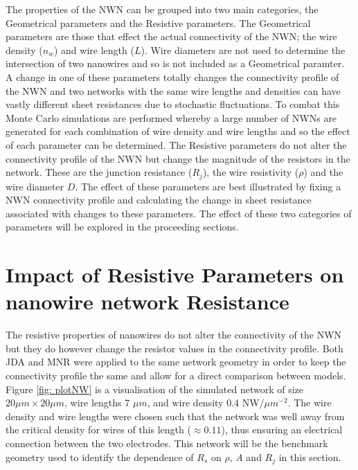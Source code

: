The properties of the NWN can be grouped into two main categories, the Geometrical parameters and the Resistive parameters. The Geometrical parameters are those that effect the actual connectivity of the NWN; the wire density ($n_w$) and wire length ($L$). Wire diameters are not used to determine the intersection of two nanowires and so is not included as a Geometrical paramter. A change in one of these parameters totally changes the connectivity profile of the NWN and two networks with the same wire lengths and densities can have vastly different sheet resistances due to stochastic fluctuations. To combat this Monte Carlo simulations are performed whereby a large number of NWNs are generated for each combination of wire density and wire lengths and so the effect of each parameter can be determined. The Resistive parameters do not alter the connectivity profile of the NWN but change the magnitude of the resistors in the network. These are the junction resistance ($R_j$), the wire resistivity ($\rho$) and the wire diameter $D$. The effect of these parameters are best illustrated by fixing a NWN connectivity profile and calculating the change in sheet resistance associated with changes to these parameters. The effect of these two categories of parameters will be explored in the proceeding sections. 
\section{Impact of Resistive Parameters on nanowire network Resistance}
\label{Sec: Resistive properties}
The resistive properties of nanowires do not alter the connectivity of the NWN but they do however change the resistor values in the connectivity profile. Both JDA and MNR were applied to the same network geometry in order to keep the connectivity profile the same and allow for a direct comparison between models. Figure \ref{fig: plotNW} is a visualisation of the simulated network of size  $20 \mu m \times 20 \mu m$, wire lengths 7 $\mu m$, and wire density 0.4 NW/$\mu m^{-2}$. The wire density and wire lengths were chosen such that the network was well away from the critical density for wires of this length ($\approx 0.11$), thus ensuring an electrical connection between the two electrodes. This network will be the benchmark geometry used to identify the dependence of $R_s$ on $\rho$, $A$ and $R_j$ in this section.

